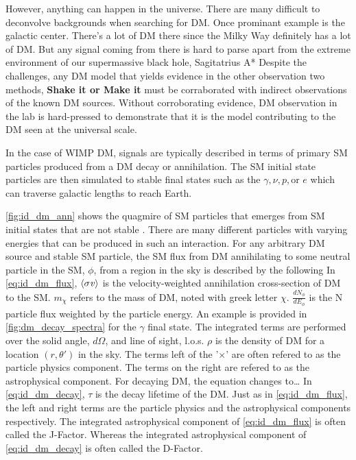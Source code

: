 However, anything can happen in the universe.
There are many difficult to deconvolve backgrounds when searching for DM.
Once prominant example is the galactic center.
There's a lot of DM there since the Milky Way definitely has a lot of DM.
But any signal coming from there is hard to parse apart from the extreme environment of our supermassive black hole, Sagitatrius A* \cite{Tracy:les_houches}
Despite the challenges, any DM model that yields evidence in the other observation two methods, \textbf{Shake it or Make it} must be corraborated with indirect observations of the known DM sources.
Without corroborating evidence, DM observation in the lab is hard-pressed to demonstrate that it is the model contributing to the DM seen at the universal scale.

In the case of WIMP DM, signals are typically described in terms of primary SM particles produced from a DM decay or annihilation.
The SM initial state particles are then simulated to stable final states such as the $\gamma, \nu, p, \text{or } e$ which can traverse galactic lengths to reach Earth.

\cref{fig:id_dm_ann} shows the quagmire of SM particles that emerges from SM initial states that are not stable \cite{2021ICRC:glory_duck}.
There are many different particles with varying energies that can be produced in such an interaction.
For any arbitrary DM source and stable SM particle, the SM flux from DM annihilating to some neutral particle in the SM, $\phi$, from a region in the sky is described by the following
\iddmannilation
In \cref{eq:id_dm_flux}, $\langle \sigma \mathit{v} \rangle$ is the velocity-weighted annihilation cross-section of DM to the SM.
$m_\chi$ refers to the mass of DM, noted with greek letter $\chi$.
$\frac{dN_{\phi}}{dE_\phi}$ is the N particle flux weighted by the particle energy.
An example is provided in \cref{fig:dm_decay_spectra} for the $\gamma$ final state.
The integrated terms are performed over the solid angle, $d\Omega$, and line of sight, l.o.s.
$\rho$ is the density of DM for a location $(r, \theta')$ in the sky.
The terms left of the '$\times$' are often refered to as the particle physics component.
The terms on the right are refered to as the astrophysical component.
For decaying DM, the equation changes to\dots
\iddmdecay
In \cref{eq:id_dm_decay}, $\tau$ is the decay lifetime of the DM.
Just as in \cref{eq:id_dm_flux}, the left and right terms are the particle physics and the astrophysical components respectively.
The integrated astrophysical component of \cref{eq:id_dm_flux} is often called the J-Factor.
Whereas the integrated astrophysical component of \cref{eq:id_dm_decay} is often called the D-Factor.

